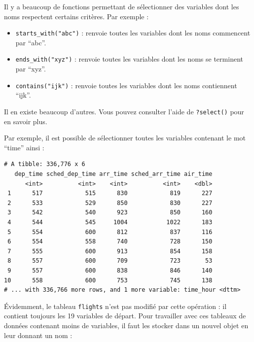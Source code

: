 \documentclass[a4paperpaper,]{article}
\newenvironment{Shaded}{\begin{snugshade}}{\end{snugshade}}
\newcommand{\KeywordTok}[1]{\textcolor[rgb]{0.12,0.11,0.11}{\textbf{#1}}}
\newcommand{\NormalTok}[1]{\textcolor[rgb]{0.12,0.11,0.11}{#1}}
\newcommand{\OperatorTok}[1]{\textcolor[rgb]{0.12,0.11,0.11}{#1}}
\newcommand{\StringTok}[1]{\textcolor[rgb]{0.75,0.01,0.01}{#1}}
\providecommand{\tightlist}{%
  \setlength{\itemsep}{0pt}\setlength{\parskip}{0pt}}
\begin{document}
Il y a beaucoup de fonctions permettant de sélectionner des variables dont les noms respectent certains critères. Par exemple :

\begin{itemize}
\tightlist
\item
  \texttt{starts\_with("abc")} : renvoie toutes les variables dont les noms commencent par ``abc''.
\item
  \texttt{ends\_with("xyz")} : renvoie toutes les variables dont les noms se terminent par ``xyz''.
\item
  \texttt{contains("ijk")} : renvoie toutes les variables dont les noms contiennent ``ijk''.
\end{itemize}

Il en existe beaucoup d'autres. Vous pouvez consulter l'aide de \texttt{?select()} pour en savoir plus.

Par exemple, il est possible de sélectionner toutes les variables contenant le mot ``time'' ainsi :

\begin{Shaded}
\end{Shaded}

\begin{verbatim}
# A tibble: 336,776 x 6
   dep_time sched_dep_time arr_time sched_arr_time air_time
      <int>          <int>    <int>          <int>    <dbl>
 1      517            515      830            819      227
 2      533            529      850            830      227
 3      542            540      923            850      160
 4      544            545     1004           1022      183
 5      554            600      812            837      116
 6      554            558      740            728      150
 7      555            600      913            854      158
 8      557            600      709            723       53
 9      557            600      838            846      140
10      558            600      753            745      138
# ... with 336,766 more rows, and 1 more variable: time_hour <dttm>
\end{verbatim}

Évidemment, le tableau \texttt{flights} n'est pas modifié par cette opération : il contient toujours les 19 variables de départ. Pour travailler avec ces tableaux de données contenant moins de variables, il faut les stocker dans un nouvel objet en leur donnant un nom :
\end{document}
